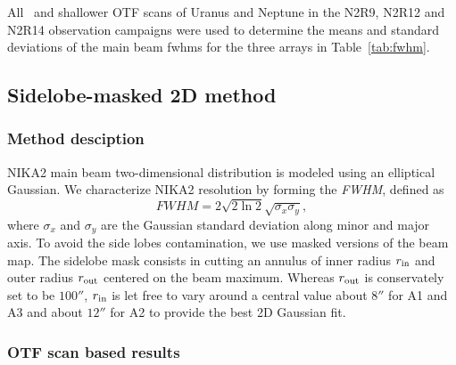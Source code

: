 All \bm\ and shallower OTF scans of Uranus and Neptune in the N2R9,
N2R12 and N2R14 observation campaigns were used to determine the means
and standard deviations of the main beam fwhms for the three arrays in
Table~\ref{tab:fwhm}.



\subsection{Sidelobe-masked 2D method}%
\label{se:beam_mb_2D}

\subsubsection{Method desciption}
\label{se:2D_method}

NIKA2 main beam two-dimensional distribution is modeled using an
elliptical Gaussian. We characterize NIKA2 resolution by forming the
\emph{FWHM}, defined as
\begin{equation}
  FWHM = 2 \sqrt{2\ln {2}} \sqrt{\sigma_x\sigma_y},
\end{equation}
where $\sigma_x$ and $\sigma_y$ are the Gaussian standard deviation
along minor and major axis.
To avoid the side lobes contamination, we use masked versions of the
beam map. The sidelobe mask consists in cutting an annulus of inner radius
$r_{\rm{in}}$ and outer radius $r_{\rm{out}}$ centered on the beam
maximum. Whereas $r_{\rm{out}}$ is conservately set to be $100''$,
$r_{\rm{in}}$ is let free to vary around a central value about $8''$
for A1 and A3 and about $12''$ for A2 to provide the best 2D Gaussian
fit.

\subsubsection{OTF scan based results}
\label{se:mb_with_otf}

